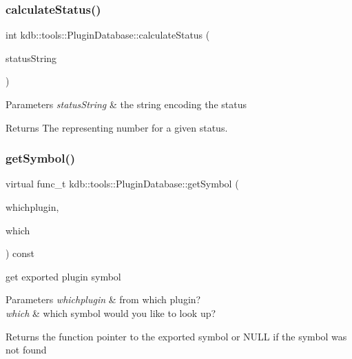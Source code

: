\subsubsection{\texorpdfstring{calculate\+Status()}{calculateStatus()}}
{\footnotesize\ttfamily int kdb\+::tools\+::\+Plugin\+Database\+::calculate\+Status (\begin{DoxyParamCaption}\item[{std\+::string}]{status\+String }\end{DoxyParamCaption})\hspace{0.3cm}{\ttfamily [static]}}


\begin{DoxyParams}{Parameters}
{\em status\+String} & the string encoding the status\\
\hline
\end{DoxyParams}
\begin{DoxyReturn}{Returns}
The representing number for a given status. 
\end{DoxyReturn}
\mbox{\label{classkdb_1_1tools_1_1PluginDatabase_a87b5ef6ee66ce1ad46cc590a2b60b9fa}} 
\subsubsection{\texorpdfstring{get\+Symbol()}{getSymbol()}}
{\footnotesize\ttfamily virtual func\+\_\+t kdb\+::tools\+::\+Plugin\+Database\+::get\+Symbol (\begin{DoxyParamCaption}\item[{\hyperlink{classkdb_1_1tools_1_1PluginSpec}{Plugin\+Spec} const \&}]{whichplugin,  }\item[{std\+::string const \&}]{which }\end{DoxyParamCaption}) const\hspace{0.3cm}{\ttfamily [pure virtual]}}



get exported plugin symbol 


\begin{DoxyParams}{Parameters}
{\em whichplugin} & from which plugin? \\
\hline
{\em which} & which symbol would you like to look up?\\
\hline
\end{DoxyParams}
\begin{DoxyReturn}{Returns}
the function pointer to the exported symbol or N\+U\+LL if the symbol was not found 
\end{DoxyReturn}


